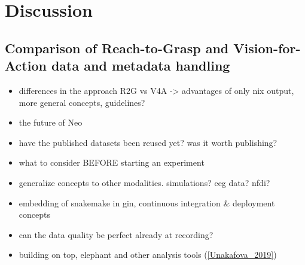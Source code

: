\clearpage
\chapter{Discussion}
\label{sec:discussion}

\section{Comparison of Reach-to-Grasp and Vision-for-Action data and metadata handling}

\begin{itemize}
 \item differences in the approach R2G vs V4A -> advantages of only nix output, more general concepts, guidelines?
 \item the future of Neo
 \item have the published datasets been reused yet? was it worth publishing?
 \item what to consider BEFORE starting an experiment
 \item generalize concepts to other modalities. simulations? eeg data? nfdi?
 \item embedding of snakemake in gin, continuous integration \& deployment concepts
 \item can the data quality be perfect already at recording?
 \item building on top, elephant and other analysis tools (\ref{Unakafova_2019})
\end{itemize}



% 
% 
% 
